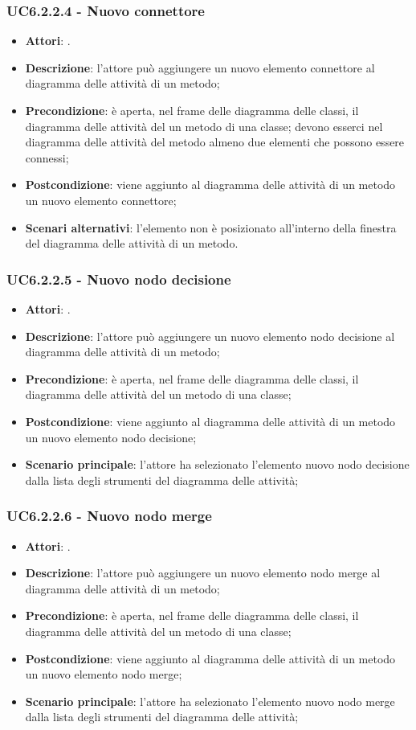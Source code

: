 \subsubsection{UC6.2.2.4 - Nuovo connettore} 
\label{sssec:UC6.2.2.4} 
\begin{itemize} 
\item \textbf{Attori}: .
\item \textbf{Descrizione}: l'attore può aggiungere un nuovo elemento connettore al diagramma delle attività di un metodo;
\item \textbf{Precondizione}: è aperta, nel frame delle diagramma delle  classi, il diagramma delle attività del un metodo di una classe; devono esserci nel diagramma delle attività del metodo almeno due elementi che possono essere connessi;
\item \textbf{Postcondizione}: viene aggiunto al diagramma delle attività di un metodo un nuovo elemento connettore;
\item \textbf{Scenari alternativi}: l'elemento non è posizionato all'interno della finestra del diagramma delle attività di un metodo.
\end{itemize} 
\subsubsection{UC6.2.2.5 - Nuovo nodo decisione} 
\label{sssec:UC6.2.2.5} 
\begin{itemize} 
\item \textbf{Attori}: .
\item \textbf{Descrizione}: l'attore può aggiungere un nuovo elemento nodo decisione al diagramma delle attività di un metodo;
\item \textbf{Precondizione}: è aperta, nel frame delle diagramma delle  classi, il diagramma delle attività del un metodo di una classe;
\item \textbf{Postcondizione}: viene aggiunto al diagramma delle attività di un metodo un nuovo elemento nodo decisione;
\item \textbf{Scenario principale}: l'attore ha selezionato l'elemento nuovo nodo decisione dalla lista degli strumenti del diagramma delle attività;\end{itemize} 
\subsubsection{UC6.2.2.6 - Nuovo nodo merge} 
\label{sssec:UC6.2.2.6} 
\begin{itemize} 
\item \textbf{Attori}: .
\item \textbf{Descrizione}: l'attore può aggiungere un nuovo elemento nodo merge al diagramma delle attività di un metodo;
\item \textbf{Precondizione}: è aperta, nel frame delle diagramma delle  classi, il diagramma delle attività del un metodo di una classe;
\item \textbf{Postcondizione}: viene aggiunto al diagramma delle attività di un metodo un nuovo elemento nodo merge;
\item \textbf{Scenario principale}: l'attore ha selezionato l'elemento nuovo nodo merge dalla lista degli strumenti del diagramma delle attività;\end{itemize} 
